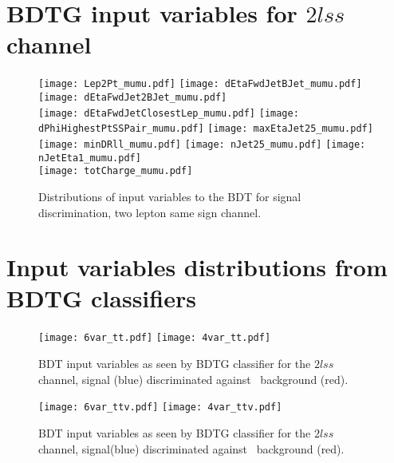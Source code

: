 \section{BDTG input variables for $2lss$ channel }

\begin{figure} [!h]
  \centering
  \texttt{[image: Lep2Pt\_mumu.pdf]}
  \texttt{[image: dEtaFwdJetBJet\_mumu.pdf]}
  \texttt{[image: dEtaFwdJet2BJet\_mumu.pdf]}\\
  \texttt{[image: dEtaFwdJetClosestLep\_mumu.pdf]}
  \texttt{[image: dPhiHighestPtSSPair\_mumu.pdf]}
  \texttt{[image: maxEtaJet25\_mumu.pdf]}\\
  \texttt{[image: minDRll\_mumu.pdf]}
  \texttt{[image: nJet25\_mumu.pdf]}
  \texttt{[image: nJetEta1\_mumu.pdf]}\\
  \texttt{[image: totCharge\_mumu.pdf]}
  \caption{Distributions of input variables to the BDT for signal discrimination, two lepton same sign channel.}
  \label{fig:input_vars_2lss}
\end{figure}  

\newpage

\section{Input variables distributions from BDTG classifiers}

\begin{figure} [!h]
  \centering
  \texttt{[image: 6var\_tt.pdf]}
  \texttt{[image: 4var\_tt.pdf]}
  \caption[BDT input variables. Discrimination against \ttbar\ in $2lss$ channel.]{BDT input variables as seen by BDTG classifier for the $2lss$ channel, \tHq signal (blue) discriminated against \ttbar\ background (red).}
  \label{mva_input_2lss_tt}
\end{figure}

\begin{figure} [!h]
  \centering
  \texttt{[image: 6var\_ttv.pdf]}
  \texttt{[image: 4var\_ttv.pdf]}
  \caption[BDT input variables. Discrimination against \ttV\ in $2lss$ channel.]{BDT input variables as seen by BDTG classifier for the $2lss$ channel, \tHq signal(blue) discriminated against \ttV\ background (red).}
  \label{mva_input_2lss_ttv}
\end{figure}

